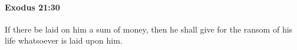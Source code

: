 
		\paragraph{Exodus 21:30} %
			\label{EXODUS-21-30}

			If there be laid on him a sum of money, then he shall give for the ransom of his life whatsoever is laid upon him.


